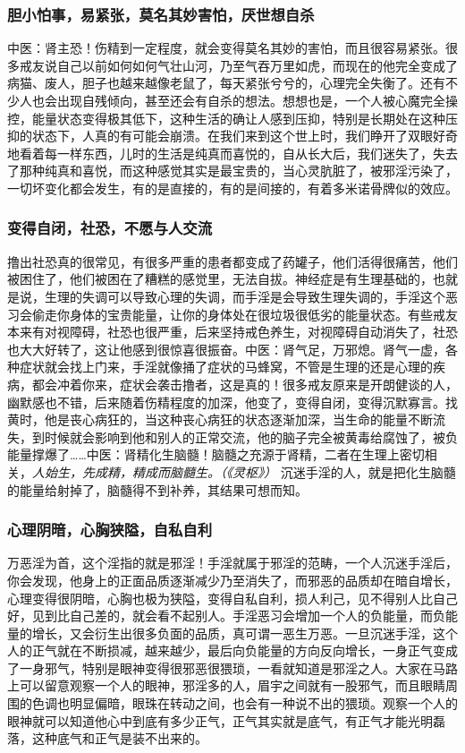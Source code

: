 \subsubsection{胆小怕事，易紧张，莫名其妙害怕，厌世想自杀}

中医：肾主恐！伤精到一定程度，就会变得莫名其妙的害怕，而且很容易紧张。很多戒友说自己以前如何如何气壮山河，乃至气吞万里如虎，而现在的他完全变成了病猫、废人，胆子也越来越像老鼠了，每天紧张兮兮的，心理完全失衡了。还有不少人也会出现自残倾向，甚至还会有自杀的想法。想想也是，一个人被心魔完全操控，能量状态变得极其低下，这种生活的确让人感到压抑，特别是长期处在这种压抑的状态下，人真的有可能会崩溃。在我们来到这个世上时，我们睁开了双眼好奇地看着每一样东西，儿时的生活是纯真而喜悦的，自从长大后，我们迷失了，失去了那种纯真和喜悦，而这种感觉其实是最宝贵的，当心灵肮脏了，被邪淫污染了，一切坏变化都会发生，有的是直接的，有的是间接的，有着多米诺骨牌似的效应。

\subsubsection{变得自闭，社恐，不愿与人交流}

撸出社恐真的很常见，有很多严重的患者都变成了药罐子，他们活得很痛苦，他们被困住了，他们被困在了糟糕的感觉里，无法自拔。神经症是有生理基础的，也就是说，生理的失调可以导致心理的失调，而手淫是会导致生理失调的，手淫这个恶习会偷走你身体的宝贵能量，让你的身体处在很垃圾很低劣的能量状态。有些戒友本来有对视障碍，社恐也很严重，后来坚持戒色养生，对视障碍自动消失了，社恐也大大好转了，这让他感到很惊喜很振奋。中医：肾气足，万邪熄。肾气一虚，各种症状就会找上门来，手淫就像捅了症状的马蜂窝，不管是生理的还是心理的疾病，都会冲着你来，症状会袭击撸者，这是真的！很多戒友原来是开朗健谈的人，幽默感也不错，后来随着伤精程度的加深，他变了，变得自闭，变得沉默寡言。找黄时，他是丧心病狂的，当这种丧心病狂的状态逐渐加深，当生命的能量不断流失，到时候就会影响到他和别人的正常交流，他的脑子完全被黄毒给腐蚀了，被负能量撑爆了……中医：肾精化生脑髓！脑髓之充源于肾精，二者在生理上密切相关，\textit{人始生，先成精，精成而脑髓生。（《灵枢》）} 沉迷手淫的人，就是把化生脑髓的能量给射掉了，脑髓得不到补养，其结果可想而知。

\subsubsection{心理阴暗，心胸狭隘，自私自利}

万恶淫为首，这个淫指的就是邪淫！手淫就属于邪淫的范畴，一个人沉迷手淫后，你会发现，他身上的正面品质逐渐减少乃至消失了，而邪恶的品质却在暗自增长，心理变得很阴暗，心胸也极为狭隘，变得自私自利，损人利己，见不得别人比自己好，见到比自己差的，就会看不起别人。手淫恶习会增加一个人的负能量，而负能量的增长，又会衍生出很多负面的品质，真可谓一恶生万恶。一旦沉迷手淫，这个人的正气就在不断损减，越来越少，最后向负能量的方向反向增长，一身正气变成了一身邪气，特别是眼神变得很邪恶很猥琐，一看就知道是邪淫之人。大家在马路上可以留意观察一个人的眼神，邪淫多的人，眉宇之间就有一股邪气，而且眼睛周围的色调也明显偏暗，眼珠在转动之间，也会有一种说不出的猥琐。观察一个人的眼神就可以知道他心中到底有多少正气，正气其实就是底气，有正气才能光明磊落，这种底气和正气是装不出来的。

